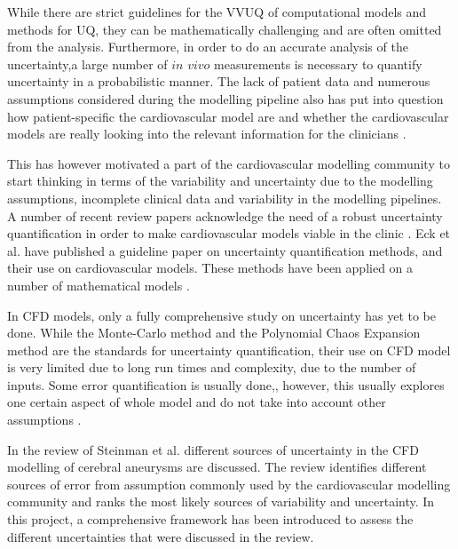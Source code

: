 While there are strict guidelines for the VVUQ of computational models and methods for UQ, they can be mathematically challenging and are often omitted from the analysis. Furthermore, in order to do an accurate analysis of the uncertainty,a large number of $in$ $vivo$ measurements is necessary to quantify uncertainty in a probabilistic manner. The lack of patient data and numerous assumptions considered during the modelling pipeline also has put into question how patient-specific the cardiovascular model are and whether the  cardiovascular models are really looking into the relevant information for the clinicians \cite{Huberts2018WhatPaper, Robertson2012ComputationalCritical, Xiang2014CFD:Assessment}. \par

This has however motivated a part of the cardiovascular modelling community to start thinking in terms of the variability and uncertainty due to the modelling assumptions, incomplete clinical data and variability in the modelling pipelines. A number of recent review papers acknowledge the need of a robust uncertainty quantification in order to make cardiovascular models viable in the clinic \cite{Huberts2018WhatPaper,Hose2019CardiovascularNext, Steinman2018Editorial:Utility, Steinman2019HowVariability}. Eck et al. \cite{Eck2016AApplications} have published a guideline paper on uncertainty quantification methods, and their use on cardiovascular models. These methods have been applied on a number of mathematical models \cite{Eck2017EffectsPredictions,Schiavazzi2017AModeling,Quarteroni2017TheApplications}.\par

In CFD models, only a fully comprehensive study on uncertainty has yet to be done. While the Monte-Carlo method and the Polynomial Chaos Expansion method are the standards for uncertainty quantification, their use on CFD model is very limited due to long run times and complexity, due to the number of inputs. Some error quantification is usually done,, however, this usually explores one certain aspect of whole model and do not take into account other assumptions \cite{Polzer2015BiomechanicalIndex,Paliwal2017MethodologyAneurysm}. \par 

In the review of Steinman et al. \cite{Steinman2019HowVariability} different sources of uncertainty in the CFD modelling of cerebral aneurysms are discussed. The review identifies different sources of error from assumption commonly used by the cardiovascular modelling community and ranks the most likely sources of variability and uncertainty. In this project, a comprehensive framework has been introduced to assess the different uncertainties that were discussed in the review.